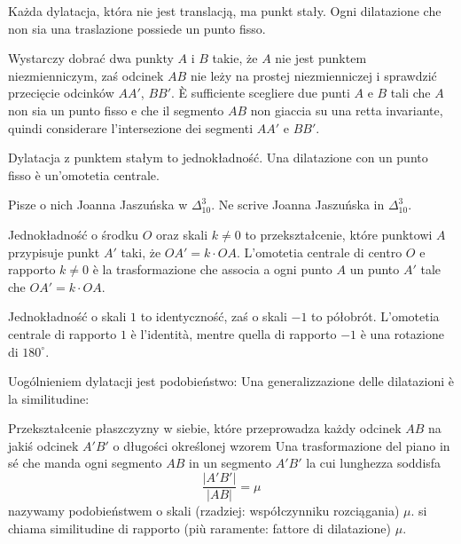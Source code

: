 \begin{proposition}
    Każda dylatacja, która nie jest translacją, ma punkt stały. %
    Ogni dilatazione che non sia una traslazione possiede un punto fisso. %
\end{proposition}

Wystarczy dobrać dwa punkty $A$ i $B$ takie, że $A$ nie jest punktem niezmienniczym, zaś odcinek $AB$ nie leży na prostej niezmienniczej i sprawdzić przecięcie odcinków $AA'$, $BB'$. %
È sufficiente scegliere due punti $A$ e $B$ tali che $A$ non sia un punto fisso e che il segmento $AB$ non giaccia su una retta invariante, quindi considerare l'intersezione dei segmenti $AA'$ e $BB'$. %

Dylatacja z punktem stałym to jednokładność. %
Una dilatazione con un punto fisso è un'omotetia centrale. %

Pisze o nich Joanna Jaszuńska w $\Delta_{10}^3$. %
Ne scrive Joanna Jaszuńska in $\Delta_{10}^3$. %


\begin{definition}
[jednokładność] %
[omotetia centrale] %
    Jednokładność o środku $O$ oraz skali $k \neq 0$ to przekształcenie, które punktowi $A$ przypisuje punkt $A'$ taki, że $OA' = k \cdot OA$. %
    L'omotetia centrale di centro $O$ e rapporto $k \neq 0$ è la trasformazione che associa a ogni punto $A$ un punto $A'$ tale che $OA' = k \cdot OA$. %
\end{definition}

\begin{example}
    Jednokładność o skali $1$ to identyczność, zaś o skali $-1$ to półobrót. %
    L'omotetia centrale di rapporto $1$ è l'identità, mentre quella di rapporto $-1$ è una rotazione di $180^\circ$. %
\end{example}

Uogólnieniem dylatacji jest podobieństwo: %
Una generalizzazione delle dilatazioni è la similitudine: %

\begin{definition}
[podobieństwo] %
[similitudine] %
    Przekształcenie płaszczyzny w siebie, które przeprowadza każdy odcinek $AB$ na jakiś odcinek $A'B'$ o długości określonej wzorem %
    Una trasformazione del piano in sé che manda ogni segmento $AB$ in un segmento $A'B'$ la cui lunghezza soddisfa %
    \begin{equation}
        \frac{|A'B'|}{|AB|} = \mu
    \end{equation}
    nazywamy podobieństwem o skali (rzadziej: współczynniku rozciągania) $\mu$. %
    si chiama similitudine di rapporto (più raramente: fattore di dilatazione) $\mu$. %
\end{definition}

